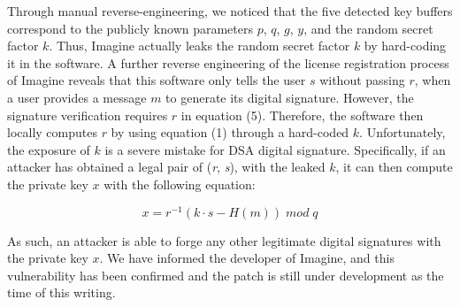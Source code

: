 Through manual reverse-engineering, we noticed that the five detected key buffers correspond to the publicly known parameters $p$, $q$, $g$, $y$, and the random secret factor $k$. 
Thus, \textsf{\small Imagine} actually leaks the random secret factor $k$ by hard-coding it in the software.
A further reverse engineering of the license registration process of \textsf{\small Imagine} reveals that this software only tells the user $s$ without passing $r$, when a user provides a message $m$ to generate its digital signature. However, the signature verification requires $r$ in equation (5). Therefore, the software then locally computes $r$ by using equation (1) through a hard-coded $k$. 
Unfortunately, the exposure of $k$ is a severe mistake for \textsf{\small DSA} digital signature.
Specifically, if an attacker has obtained a legal pair of (\emph{r}, \emph{s}), with the leaked $k$, it can then compute the private key $x$ with the following equation:

\begin{equation}
x = r^{-1}(k \cdot s - H(m)) \; mod \; q
\end{equation}

\noindent As such, an attacker is able to forge any other legitimate digital signatures with the private key $x$. We have informed the developer of \textsf{\small Imagine}, and this vulnerability has been confirmed and the patch is still under development as the time of this writing.






